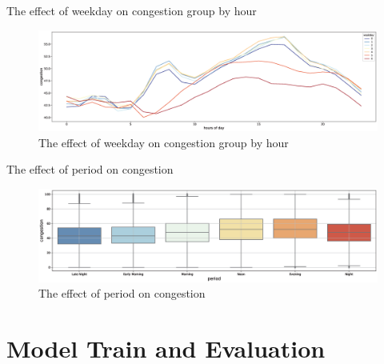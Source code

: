 \documentclass[
 size=14pt,
 paper=smartboard,  %
 mode=present, 		%
 display=slides, 	%
 style=tuliplab,  	%
 pauseslide,
 fleqn,leqno]{powerdot}
\begin{document}
\begin{slide}[toc=,bm=]{The effect of weekday on congestion group by hour }
	\begin{figure}
		\setlength{\abovecaptionskip}{0.4cm} 
		\raggedleft
		\includegraphics[scale=0.35]{figure/hour.eps}
		\centering
		\caption{The effect of weekday on congestion group by hour}
		\label{group by hour}
	\end{figure}
\end{slide}
\begin{slide}[toc=,bm=]{The effect of period on congestion}
\begin{center}
	\begin{figure}
		\setlength{\abovecaptionskip}{0.4cm} 
		\raggedleft
		\includegraphics[scale=0.45]{figure/period.eps}
		\centering
		\caption{The effect of period on congestion}
		\label{gperiod}
	\end{figure}
\end{center}
\end{slide}
\section{ Model Train and Evaluation}
\end{document}
